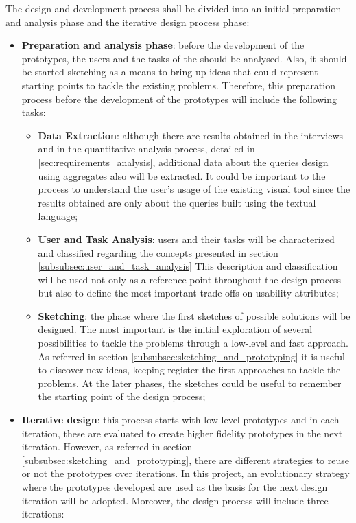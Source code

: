 The design and development process shall be divided into an initial preparation and analysis phase and the iterative design process phase:

\begin{itemize}
    \item \textbf{Preparation and analysis phase}: before the development of the prototypes, the users and the tasks of the should be analysed. Also, it should be started sketching as a means to bring up ideas that could represent starting points to tackle the existing problems. Therefore, this preparation process before the development of the prototypes will include the following tasks:
    \begin{itemize}
        \item \textbf{Data Extraction}: although there are results obtained in the interviews and in the quantitative analysis process, detailed in \ref{sec:requirements_analysis}, additional data about the queries design using aggregates also will be extracted. It could be important to the process to understand the user's usage of the existing visual tool since the results obtained are only about the queries built using the textual language;
        \item \textbf{User and Task Analysis}: users and their tasks will be characterized and classified regarding the concepts presented in section \ref{subsubsec:user_and_task_analysis} This description and classification will be used not only as a reference point throughout the design process but also to define the most important trade-offs on usability attributes;
        \item \textbf{Sketching}: the phase where the first sketches of possible solutions will be designed. The most important is the initial exploration of several possibilities to tackle the problems through a low-level and fast approach. As referred in section \ref{subsubsec:sketching_and_prototyping} it is useful to discover new ideas, keeping register the first approaches to tackle the problems. At the later phases, the sketches could be useful to remember the starting point of the design process;
    \end{itemize}
    \item \textbf{Iterative design}: this process starts with low-level prototypes and in each iteration, these are evaluated to create higher fidelity prototypes in the next iteration. However, as referred in section \ref{subsubsec:sketching_and_prototyping}, there are different strategies to reuse or not the prototypes over iterations. In this project, an evolutionary strategy where the prototypes developed are used as the basis for the next design iteration will be adopted. Moreover, the design process will include three iterations:

\end{itemize}
